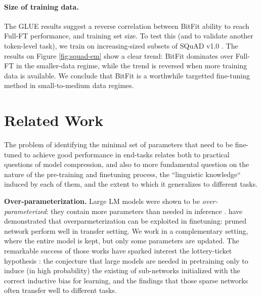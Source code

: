 \paragraph{Size of training data.} The GLUE results suggest a reverse correlation between BitFit ability to reach Full-FT performance, and training set size. To test this (and to validate another token-level task), we train on increasing-sized subsets of SQuAD v1.0 \citet{squad_v1}. The results on Figure \ref{fig:squad-em} show a clear trend: BitFit dominates over Full-FT in the smaller-data regime, while the trend is reversed when more training data is available. We conclude that BitFit is a worthwhile targetted fine-tuning method in small-to-medium data regimes.

\section{Related Work}

The problem of identifying the minimal set of parameters that need to be fine-tuned to achieve good performance in end-tasks relates both to practical questions of model compression, and also to more fundamental question on the nature of the pre-training and finetuning process, the ``linguistic knowledge`` induced by each of them, and the extent to which it generalizes to different tasks. 

\textbf{Over-parameterization.}\quad
 Large LM models were shown to be \emph{over-parameterized}: they contain more parameters than needed in inference \citep{compression-orig, DBLP:journals/corr/HintonVD15, DBLP:conf/iclr/UrbanGKAWMPRC17, DBLP:journals/tnn/Karnin90, DBLP:journals/tnn/Reed93, DBLP:journals/cejcs/AugastaK13, DBLP:conf/interspeech/LiuZW14, han2015learning, DBLP:conf/iclr/MolchanovTKAK17}. \citet{DBLP:journals/corr/abs-2002-08307} have demonstrated that overparmeterization can be exploited in finetuning: pruned network perform well in transfer setting. We work in a complementary setting, where the entire model is kept, but only some parameters are updated.  The remarkable success of those works have sparked interest the lottery-ticket hypothesis \citep{DBLP:conf/iclr/FrankleC19, DBLP:conf/nips/ChenFC0ZWC20, DBLP:conf/emnlp/PrasannaRR20}: the conjecture that large models are needed in pretraining only to induce (in high probability) the existing of sub-networks initialized with the correct inductive bias for learning, and the findings that those sparse networks often transfer well to different tasks. 

